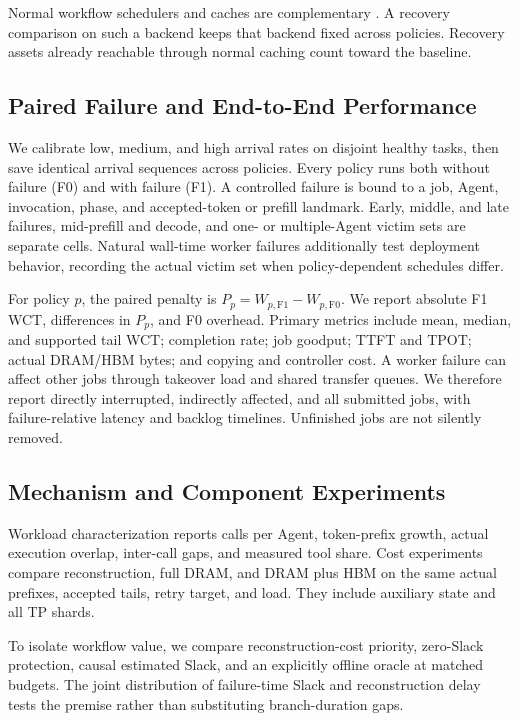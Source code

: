 Normal workflow schedulers and caches are complementary
\cite{lin2024parrot,pan2025kvflow,ni2026topas}. A recovery comparison on
such a backend keeps that backend fixed across policies. Recovery assets
already reachable through normal caching count toward the baseline.

\subsection{Paired Failure and End-to-End Performance}\label{sec:eval-main}

We calibrate low, medium, and high arrival rates on disjoint healthy tasks,
then save identical arrival sequences across policies. Every policy runs
both without failure (F0) and with failure (F1). A controlled failure is
bound to a job, Agent, invocation, phase, and accepted-token or prefill
landmark. Early, middle, and late failures, mid-prefill and decode, and
one- or multiple-Agent victim sets are separate cells. Natural wall-time
worker failures additionally test deployment behavior, recording the actual
victim set when policy-dependent schedules differ.

For policy $p$, the paired penalty is
$P_p=W_{p,\mathrm{F1}}-W_{p,\mathrm{F0}}$.
We report absolute F1 WCT, differences in $P_p$, and F0 overhead. Primary
metrics include mean, median, and supported tail WCT; completion rate;
job goodput; TTFT and TPOT; actual DRAM/HBM bytes; and copying and controller
cost. A worker failure can affect other jobs through takeover load and
shared transfer queues. We therefore report directly interrupted,
indirectly affected, and all submitted jobs, with failure-relative latency
and backlog timelines. Unfinished jobs are not silently removed.

\subsection{Mechanism and Component Experiments}\label{sec:eval-native}

Workload characterization reports calls per Agent, token-prefix growth,
actual execution overlap, inter-call gaps, and measured tool share.
Cost experiments compare reconstruction, full DRAM, and DRAM plus HBM on
the same actual prefixes, accepted tails, retry target, and load. They
include auxiliary state and all TP shards.

To isolate workflow value, we compare reconstruction-cost priority,
zero-Slack protection, causal estimated Slack, and an explicitly offline
oracle at matched budgets. The joint distribution of failure-time Slack
and reconstruction delay tests the premise rather than substituting
branch-duration gaps.

